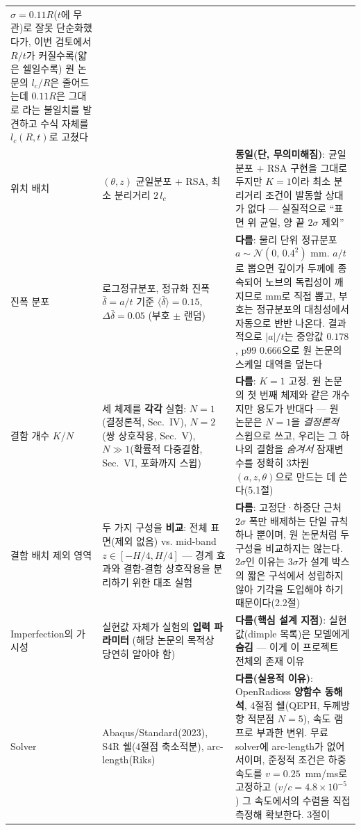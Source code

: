\documentclass[11pt]{article}
\begin{document}
\begin{longtable}{@{}p{2.6cm}p{5.4cm}p{5.4cm}@{}}
  $\sigma=0.11R$($t$에 무관)로 잘못 단순화했다가, 이번 검토에서 $R/t$가
  커질수록(얇은 쉘일수록) 원 논문의 $l_c/R$은 줄어드는데 $0.11R$은 그대로
  라는 불일치를 발견하고 수식 자체를 $l_c(R,t)$로 고쳤다 \\
\addlinespace
위치 배치 &
  $(\theta,z)$ 균일분포 + RSA, 최소 분리거리 $2\,l_c$ &
  \textbf{동일(단, 무의미해짐)}: 균일분포 + RSA 구현을 그대로 두지만
  $K{=}1$이라 최소 분리거리 조건이 발동할 상대가 없다 --- 실질적으로
  ``표면 위 균일, 양 끝 $2\sigma$ 제외'' \\
\addlinespace
진폭 분포 &
  로그정규분포, 정규화 진폭 $\bar\delta{=}a/t$ 기준
  $\langle\bar\delta\rangle{=}0.15$, $\Delta\bar\delta{=}0.05$ (부호 $\pm$ 랜덤) &
  \textbf{다름}: 물리 단위 정규분포 $a \sim \mathcal{N}(0,\,0.4^2)$ mm.
  $a/t$로 뽑으면 깊이가 두께에 종속되어 노브의 독립성이 깨지므로 mm로 직접
  뽑고, 부호는 정규분포의 대칭성에서 자동으로 반반 나온다. 결과적으로
  $|a|/t$는 중앙값 $0.178$, p99 $0.666$으로 원 논문의 스케일 대역을 덮는다 \\
\addlinespace
결함 개수 $K$/$N$ &
  세 체제를 \textbf{각각} 실험: $N{=}1$(결정론적, Sec.~IV), $N{=}2$(쌍
  상호작용, Sec.~V), $N\gg1$(확률적 다중결함, Sec.~VI, 포화까지 스윕) &
  \textbf{다름}: $K{=}1$ 고정. 원 논문의 첫 번째 체제와 같은 개수지만 용도가
  반대다 --- 원 논문은 $N{=}1$을 \emph{결정론적} 스윕으로 쓰고, 우리는 그
  하나의 결함을 \emph{숨겨서} 잠재변수를 정확히 3차원 $(a,z,\theta)$으로
  만드는 데 쓴다(5.1절) \\
\addlinespace
결함 배치 제외 영역 &
  두 가지 구성을 \textbf{비교}: 전체 표면(제외 없음) vs. mid-band
  $z\in[-H/4,H/4]$ --- 경계 효과와 결함-결함 상호작용을 분리하기 위한 대조
  실험 &
  \textbf{다름}: 고정단·하중단 근처 $2\sigma$ 폭만 배제하는 단일 규칙 하나
  뿐이며, 원 논문처럼 두 구성을 비교하지는 않는다. $2\sigma$인 이유는
  $3\sigma$가 설계 박스의 짧은 구석에서 성립하지 않아 기각을 도입해야 하기
  때문이다(2.2절) \\
\addlinespace
Imperfection의 가시성 &
  실현값 자체가 실험의 \textbf{입력 파라미터} (해당 논문의 목적상 당연히 알아야 함) &
  \textbf{다름(핵심 설계 지점)}: 실현값(dimple 목록)은 모델에게
  \textbf{숨김} --- 이게 이 프로젝트 전체의 존재 이유 \\
\addlinespace
Solver &
  Abaqus/Standard(2023), S4R 쉘(4절점 축소적분), arc-length(Riks) &
  \textbf{다름(실용적 이유)}: OpenRadioss \textbf{양함수 동해석}, 4절점
  쉘(QEPH, 두께방향 적분점 $N{=}5$), 속도 램프로 부과한 변위. 무료 solver에
  arc-length가 없어서이며, 준정적 조건은 하중 속도를 $v = 0.25$~mm/ms로 고정하고
  ($v/c = 4.8\times10^{-5}$) 그 속도에서의 수렴을 직접 측정해 확보한다. 3절이

\end{longtable}
\end{document}
